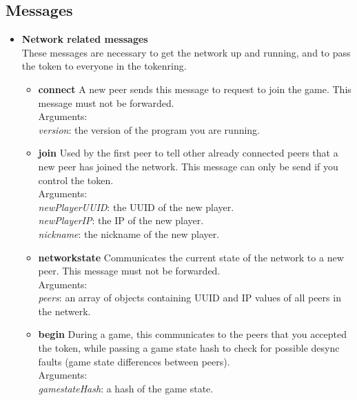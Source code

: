     \subsection{Messages}
    \begin{itemize}
      \item \textbf{Network related messages} \\
      These messages are necessary to get the network up and running, and to pass the token to everyone in the tokenring.
        \begin{itemize}
          \item \textbf{connect}
    A new peer sends this message to request to join the game. This message must not be forwarded.\\
    Arguments: \\
    \textit{version}: the version of the program you are running. \\

          \item \textbf{join}
    Used by the first peer to tell other already connected peers that a new peer has joined the network. This message can only be send if you control the token.\\
    Arguments: \\
    \textit{newPlayerUUID}: the UUID of the new player. \\
    \textit{newPlayerIP}: the IP of the new player. \\
    \textit{nickname}: the nickname of the new player. \\

          \item \textbf{networkstate}
    Communicates the current state of the network to a new peer. This message must not be forwarded.\\
    Arguments: \\
    \textit{peers}: an array of objects containing UUID and IP values of all peers in the netwerk. \\

          \item \textbf{begin}
    During a game, this communicates to the peers that you accepted the token, while passing a game state hash to check for possible desync faults (game state differences between peers).\\
    Arguments: \\
    \textit{gamestateHash}: a hash of the game state. \\


\end{itemize}
\end{itemize}
